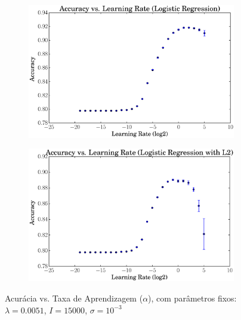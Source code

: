 \documentclass[a4paper, 12pt]{article}
\begin{document}
\begin{figure}[htpb]
\begin{subfigure}[htpb]{0.45\textwidth}
        \caption{}
        \label{fig:rate_linregL2}
    \end{subfigure}
    \hfill %
    \begin{subfigure}[htpb]{0.45\textwidth}
        \includegraphics[width=\textwidth]{acc_vs_rate_logreg}
        \caption{}
        \label{fig:rate_logreg}
    \end{subfigure}
    \begin{subfigure}[htpb]{0.45\textwidth}
        \includegraphics[width=\textwidth]{acc_vs_rate_logregL2}
        \caption{}
        \label{fig:rate_logregL2}
    \end{subfigure}
    \caption{Acurácia vs. Taxa de Aprendizagem ($\alpha$), com parâmetros
    fixos: $\lambda=0.0051$, $I=15000$, $\sigma=10^{-3}$}\label{fig:rate}
\end{figure}
\end{document}
